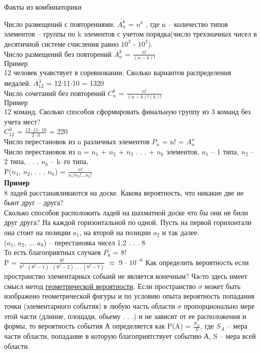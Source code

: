 \documentclass[russian, 12pt]{article}
\begin{document}
\newpage
\begin{center}
$\textbf{Факты из комбинаторики}$
\end{center}
Число размещений с повторениями. $\overline{A^k_n}$ = $n^k$ , 
где n -- количество типов элементов -- группы по k элементов с учетом порядка(число трехзначных чисел в десятичной системе счисления равно $10^3$ - $10^2$).\\
Число размещений без повторений $A^k_n$ = $\frac{n!}{(n-k)!}$\\
$\textbf{Пример}$ \\12 человек учавствует в соревновании. Сколько вариантов распределения медалей. $\overline{A^3_{12}}$  = 12$\cdot$11$\cdot$10  = 1320\\
Число сочетаний без повторений  $C^k_n$ = $\frac{n!}{(n-k)!(k)!}$\\
$\textbf{Пример}$ \\12 команд. Сколько способов сформировать финальную группу из 3 команд без учета мест?\\
  $C^3_{12}$  = $\frac{ 12\cdot11\cdot 10 }{2\cdot3} $ = 220\\
Число  перестановок из n различных элементов $P_n$ = n! = ${A^n_n}$\\
Число перестановок из n = $n_1$ + $n_2$ +  $n_3$ . . .  + $n_k$ элементов, $n_1$ -- 1 типа, $n_2$ -- 2 типа, . . . $n_k$ -- k--го типа,\\
P($n_1$,  $n_2$, . . .  $n_k$) = $\frac{n!}{{n_1}!{n_2}!. . .{n_k}!}$\\
\textbf{Пример}\\ 8 ладей расстанавливаются на доске. Какова вероятность, что никакие две не бьют друг -- друга?\\
Сколько способов расположить ладей на шахматной доске что бы они не били друг друга? На каждой горизонтальной по одной. Пусть  на первой горихонтали она стоит на позиции $a_1$,  на второй на позиции $a_2$ и так далее.\\
($a_1$, $a_2$, ... $a_8$)  -- перестановка чисел 1,2 . . . 8\\
То есть благоприятных случаев $P_8$ = 8!\\
P = $\frac{8!}{ 8^2 \cdot (8^2 - 1) \cdot (8^2 - 2)  \ .\ .\ . \   (8^2 - 7)} $  $\approx$   9 $\cdot$  $10^{-6}$
Как определить вероятность если пространство элементарных собыий не является конечным? Чаcто здесь имеет смысл метод \underline{геометрической вероятности}. Если пространство  $\sigma$ может быть изображено геометрической фигуры и по условию опыта вероятность попадания точки (элементарного события) в любую часть области $\sigma$ пропорционально мере этой части (длинне, площади, обьему . . .) и не зависит от ее расположения и формы, то вероятность события А определяется как P(A) = $\frac{S_A}{S}$, где $S_A$ -- мера части области, попадание в которую благоприятствует событию А, S -- мера всей области.\\
\end{document}
